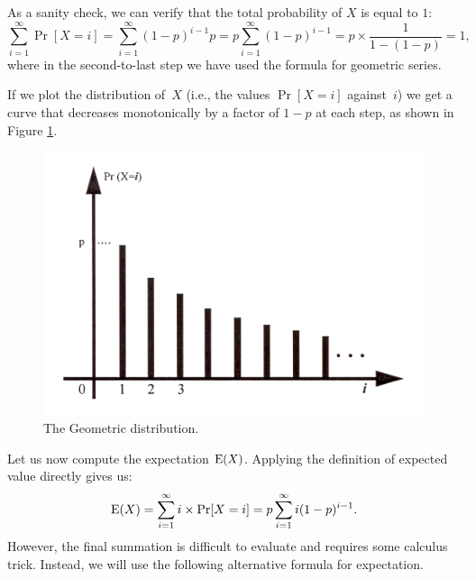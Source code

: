 \documentclass[11pt]{article}
\def\Ex#1{{\rm E}(#1)}
\begin{document}
As a sanity check, we can verify that the total probability of $X$ is equal to $1$:
$$\sum_{i=1}^\infty \Pr[X = i] = \sum_{i=1}^\infty (1-p)^{i-1} p = p \sum_{i=1}^\infty (1-p)^{i-1} = p \times \frac{1}{1-(1-p)} = 1,$$
where in the second-to-last step we have used the formula for geometric series.

If we plot the distribution of~$X$ (i.e., the values $\Pr[X=i]$
against~$i$) we get a curve that decreases monotonically by a
factor of $1-p$ at each step, as shown in Figure \ref{fig:geometric}.

\begin{figure}[h!]
\centering
\includegraphics[scale=0.8]{geometric}
\caption{The Geometric distribution.}
\label{fig:geometric}
\end{figure}

Let us now compute the expectation $\Ex{X}$. Applying the definition of expected value
directly gives us:
$$ \Ex{X} = \sum_{i=1}^\infty i \times \Pr[X = i] = p\sum_{i=1}^\infty i(1-p)^{i-1}.$$
However, the final summation is difficult to evaluate and requires some calculus trick.
Instead, we will use the following alternative formula for expectation.
\end{document}
